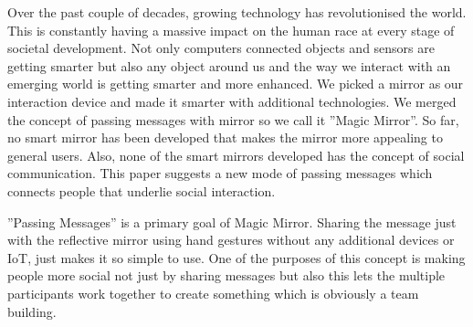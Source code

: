 \documentclass{sigchi-ext}
\begin{document}
    
Over the past couple of decades, growing technology has revolutionised the world. This is constantly having a massive impact on the human race at every stage of societal development. Not only computers connected objects and sensors are getting smarter but also any object around us and the way we interact with an emerging world is getting smarter and more enhanced. We picked a mirror as our interaction device and made it smarter with additional technologies. We merged the concept of passing messages with mirror so we call it ''Magic Mirror''. So far, no smart mirror has been developed that makes the mirror more appealing to general users. Also, none of the smart mirrors developed has the concept of social communication. This paper suggests a new mode of passing messages which connects people that underlie social interaction.

''Passing Messages'' is a primary goal of Magic Mirror. Sharing the message just with the reflective mirror using hand gestures without any additional devices or IoT, just makes it so simple to use. One of the purposes of this concept is making people more social not just by sharing messages but also this lets the multiple participants work together to create something which is obviously a team building.
\end{document}
